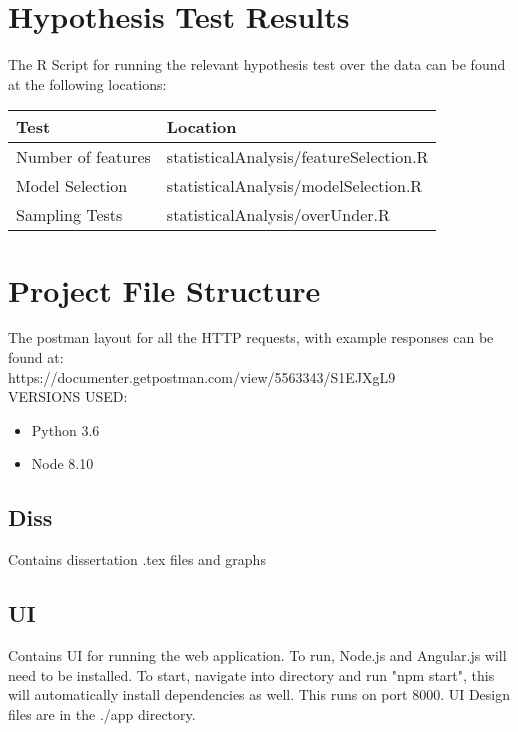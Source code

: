 
\begin{appendices}

\section{Hypothesis Test Results}
\label{appendix:hypothesis}
The R Script for running the relevant hypothesis test over the data can be found at the following locations:
\begin{center}

\begin{tabular}{|l|l|}
\hline
 Test &  Location\\ \hline
 Number of features &  statisticalAnalysis/featureSelection.R\\
 Model Selection &  statisticalAnalysis/modelSelection.R\\
 Sampling Tests &  statisticalAnalysis/overUnder.R\\ \hline
\end{tabular}
\end{center}

\section{Project File Structure}

The postman layout for all the HTTP requests, with example responses can be found at:
\\ https://documenter.getpostman.com/view/5563343/S1EJXgL9
\\ 
VERSIONS USED: 
\begin{itemize}
    \item Python 3.6
    \item Node  8.10
\end{itemize}

\subsection{Diss}
Contains dissertation .tex files and graphs

\subsection{UI}
Contains UI for running the web application.  To run, Node.js and Angular.js will need to be installed.
To start, navigate into directory and run "npm start", this will automatically install dependencies as well.
This runs on port 8000.
UI Design files are in the ./app directory.


\end{appendices}
